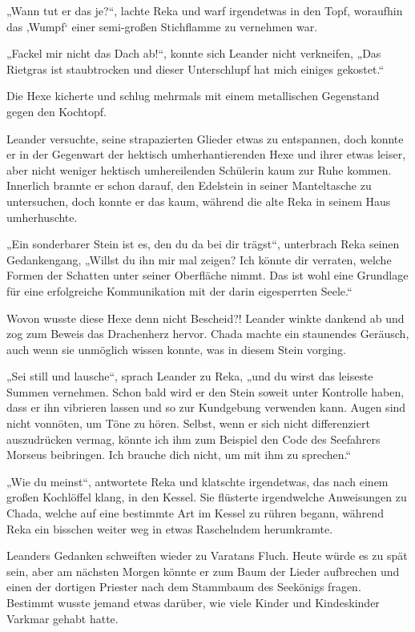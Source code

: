\documentclass[10pt, a4paper, oneside]{book}
\begin{document}
„Wann tut er das je?“, lachte Reka und warf irgendetwas in den Topf, woraufhin das ‚Wumpf‘ einer semi-großen Stichflamme zu vernehmen war.

„Fackel mir nicht das Dach ab!“, konnte sich Leander nicht verkneifen, „Das Rietgras ist staubtrocken und dieser Unterschlupf hat mich einiges gekostet.“

Die Hexe kicherte und schlug mehrmals mit einem metallischen Gegenstand gegen den Kochtopf.

Leander versuchte, seine strapazierten Glieder etwas zu entspannen, doch konnte er in der Gegenwart der hektisch umherhantierenden Hexe und ihrer etwas leiser, aber nicht weniger hektisch umhereilenden Schülerin kaum zur Ruhe kommen. Innerlich brannte er schon darauf, den Edelstein in seiner Manteltasche zu untersuchen, doch konnte er das kaum, während die alte Reka in seinem Haus umherhuschte.

„Ein sonderbarer Stein ist es, den du da bei dir trägst“, unterbrach Reka seinen Gedankengang, „Willst du ihn mir mal zeigen? Ich könnte dir verraten, welche Formen der Schatten unter seiner Oberfläche nimmt. Das ist wohl eine Grundlage für eine erfolgreiche Kommunikation mit der darin eigesperrten Seele.“

Wovon wusste diese Hexe denn nicht Bescheid?! Leander winkte dankend ab und zog zum Beweis das Drachenherz hervor. Chada machte ein staunendes Geräusch, auch wenn sie unmöglich wissen konnte, was in diesem Stein vorging.

„Sei still und lausche“, sprach Leander zu Reka, „und du wirst das leiseste Summen vernehmen. Schon bald wird er den Stein soweit unter Kontrolle haben, dass er ihn vibrieren lassen und so zur Kundgebung verwenden kann. Augen sind nicht vonnöten, um Töne zu hören. Selbst, wenn er sich nicht differenziert auszudrücken vermag, könnte ich ihm zum Beispiel den Code des Seefahrers Morseus beibringen. Ich brauche dich nicht, um mit ihm zu sprechen.“

„Wie du meinst“, antwortete Reka und klatschte irgendetwas, das nach einem großen Kochlöffel klang, in den Kessel. Sie flüsterte irgendwelche Anweisungen zu Chada, welche auf eine bestimmte Art im Kessel zu rühren begann, während Reka ein bisschen weiter weg in etwas Raschelndem herumkramte.

Leanders Gedanken schweiften wieder zu Varatans Fluch. Heute würde es zu spät sein, aber am nächsten Morgen könnte er zum Baum der Lieder aufbrechen und einen der dortigen Priester nach dem Stammbaum des Seekönigs fragen. Bestimmt wusste jemand etwas darüber, wie viele Kinder und Kindeskinder Varkmar gehabt hatte.
\end{document}
